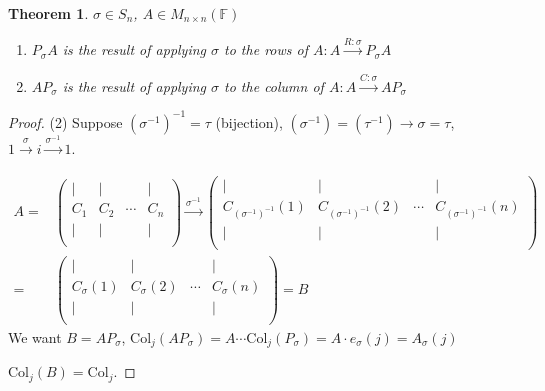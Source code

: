 \documentclass[12pt]{article}
\newtheorem{theorem}{Theorem}[subsection]
\newcommand{\Col}{\mathrm{Col}}
\newcommand{\mF}{{\mathbb{F}}}
\begin{document}
\begin{theorem}
	$\sigma \in S_n$, $A \in M_{n\times n} (\mF)$
	\begin{enumerate}
		\item $P_{\sigma} A$ is the result of applying $\sigma$ to the rows of 
			$A : A \overset{R: \sigma}{\longrightarrow} P_{\sigma}A$
		\item $A P_{\sigma}$ is the result of applying $\sigma$ to the column
			of $A:A \overset{C: \sigma}{\longrightarrow} AP_{\sigma}$
	\end{enumerate}
\end{theorem}
\begin{proof}
	(2) Suppose $(\sigma^{-1})^{-1} = \tau$ (bijection), 
	$(\sigma^{-1}) = (\tau^{-1}) \rightarrow \sigma = \tau$, 
	$1 \overset{\sigma}{\longrightarrow}i 
	\overset{\sigma^{-1}}{\longrightarrow} 1$. 

	\begin{align*}
		A = &
		\begin{pmatrix}
			| & | &  & |	\\
			C_1 & C_2 & \cdots & C_n	\\
			| & | &  & |	\\
		\end{pmatrix}
		\overset{\sigma^{-1}}{\longrightarrow}
		\begin{pmatrix}
			| & | &  & |	\\
			C_{(\sigma^{-1})^{-1}}(1) & C_{(\sigma^{-1})^{-1}}(2) &
			\cdots & C_{(\sigma^{-1})^{-1}}(n)	\\
			| & | &  & |	\\
		\end{pmatrix}\\
		=&
		\begin{pmatrix}
			| & | &  & |	\\
			C_{\sigma}(1) & C_{\sigma}(2) &
			\cdots &C_{\sigma}(n)	\\
			| & | &  & |	\\
		\end{pmatrix}
		= B
	\end{align*}
	We want $B = A P_{\sigma}$, 
	$\Col_j(AP_{\sigma}) = A\cdots \Col_j(P_{\sigma}) = A \cdot e_{\sigma}(j)
	= A_{\sigma}(j)$ 

	$\Col_j(B) = \Col_j$. 
\end{proof}
\end{document}
